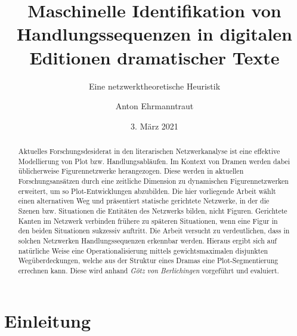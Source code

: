 \documentclass[a4paper,10pt,abstract=true,headings=small]{scrartcl}
\author{Anton Ehrmanntraut}
\date{3. März 2021}
\title{Maschinelle Identifikation von Handlungssequenzen in digitalen Editionen dramatischer Texte}
\subtitle{\vspace*{.5cm}Eine netzwerktheoretische Heuristik\vspace*{.5cm}}
\begin{document}
\flushbottom

%


\maketitle

\begin{abstract}
    Aktuelles Forschungsdesiderat in den literarischen Netzwerkanalyse ist eine effektive Modellierung von Plot bzw. Handlungsabläufen.
    Im Kontext von Dramen werden dabei üblicherweise Figurennetzwerke herangezogen.
    Diese werden in aktuellen Forschungsansätzen durch eine zeitliche Dimension zu dynamischen Figurennetzwerken erweitert, um so Plot-Entwicklungen abzubilden.
    Die hier vorliegende Arbeit wählt einen alternativen Weg und präsentiert statische gerichtete Netzwerke, in der die Szenen bzw. Situationen die Entitäten des Netzwerks bilden, nicht Figuren.
    Gerichtete Kanten im Netzwerk verbinden frühere zu späteren Situationen, wenn eine Figur in den beiden Situationen sukzessiv auftritt.
    Die Arbeit versucht zu verdeutlichen, dass in solchen Netzwerken Handlungssequenzen erkennbar werden.
    Hieraus ergibt sich auf natürliche Weise eine Operationalisierung mittels gewichtsmaximalen disjunkten Wegüberdeckungen, welche aus der Struktur eines Dramas eine Plot-Segmentierung errechnen kann.
    Diese wird anhand \emph{Götz von Berlichingen} vorgeführt und evaluiert.
\end{abstract}




\section{Einleitung}



\end{document}
